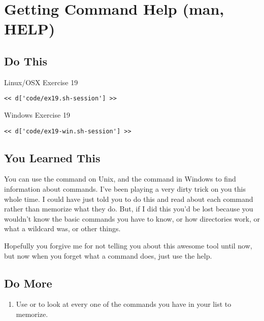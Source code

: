 \chapter{Getting Command Help (man, HELP)}

\section{Do This}

\begin{code}{Linux/OSX Exercise 19}
\begin{Verbatim}
<< d['code/ex19.sh-session'] >>
\end{Verbatim}
\end{code}

\begin{code}{Windows Exercise 19}
\begin{Verbatim}
<< d['code/ex19-win.sh-session'] >>
\end{Verbatim}
\end{code}

\section{You Learned This}

You can use the  command on Unix, and the  command
in Windows to find information about commands.  I've been playing a very dirty
trick on you this whole time.  I could have just told you to do this and read
about each command rather than memorize what they do.  But, if I did this you'd
be lost because you wouldn't know the basic commands you have to know, or how
directories work, or what a wildcard was, or other things.

Hopefully you forgive me for not telling you about this awesome tool until now,
but now when you forget what a command does, just use the help.

\section{Do More}

\begin{enumerate}
\item Use  or  to look at every one of the commands you have in your list to memorize.
\end{enumerate}

